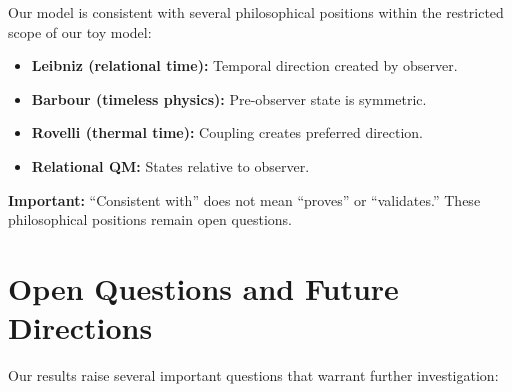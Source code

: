 \documentclass[12pt,a4paper]{article}
\begin{document}
Our model is consistent with several philosophical positions within the 
restricted scope of our toy model:

\begin{itemize}[leftmargin=*]
\item \textbf{Leibniz (relational time):} Temporal direction created by observer.
\item \textbf{Barbour (timeless physics):} Pre-observer state is symmetric.
\item \textbf{Rovelli (thermal time):} Coupling creates preferred direction.
\item \textbf{Relational QM:} States relative to observer.
\end{itemize}

\textbf{Important:} ``Consistent with'' does not mean ``proves'' or 
``validates.'' These philosophical positions remain open questions.

\section{Open Questions and Future Directions}\label{sec:open_questions}

Our results raise several important questions that warrant further investigation:
\end{document}
